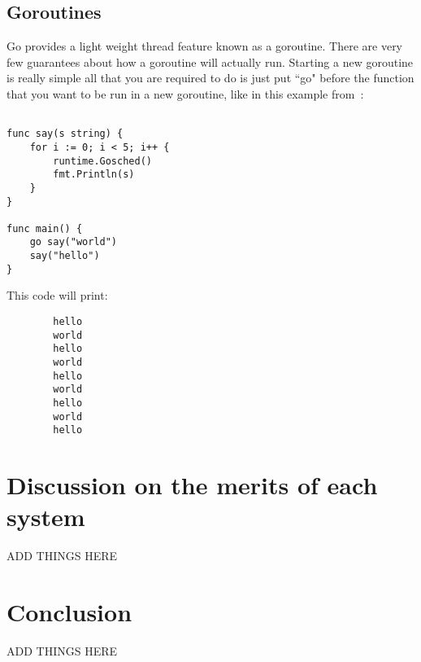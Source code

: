 \documentclass{acm_proc_article-sp}
\begin{document}
	\subsection{Goroutines}
		Go provides a light weight thread feature known as a goroutine. There are very few guarantees about how a goroutine will actually run. Starting a new goroutine is really simple all that you are required to do is just put ``go" before the function that you want to be run in a new goroutine, like in this example from~\cite{go:tour}:
		
		\begin{verbatim}
				
func say(s string) {
	for i := 0; i < 5; i++ {
		runtime.Gosched()
		fmt.Println(s)
	}
}

func main() {
	go say("world")
	say("hello")
}
		\end{verbatim}
		
		This code will print:
		
		\begin{verbatim}
		hello
		world
		hello
		world
		hello
		world
		hello
		world
		hello
		\end{verbatim}
		
\section{Discussion on the merits of each system}
	ADD THINGS HERE
	
\section{Conclusion}
	ADD THINGS HERE



\end{document}
